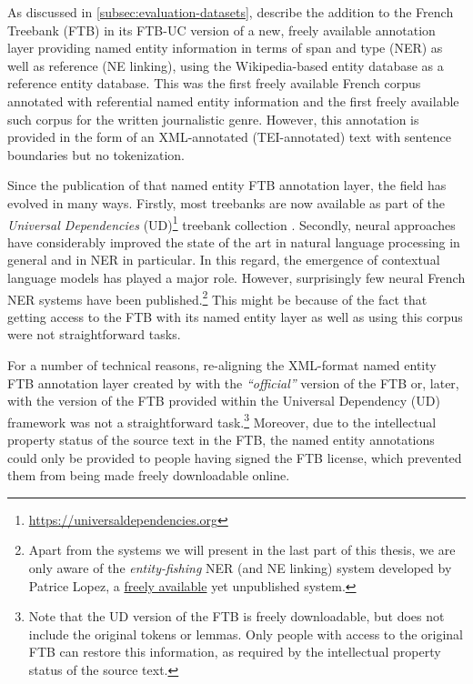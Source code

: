 As discussed in \ref{subsec:evaluation-datasets}, \citet{sagot-etal-2012-annotation} describe the addition to the French Treebank (FTB) \citep{abeille-etal-2003-building} in its FTB-UC version \citep{candito-etal-2010-statistical} of a new, freely available annotation layer providing named entity information in terms of span and type (NER) as well as reference (NE linking), using the Wikipedia-based \aleda entity database \cite{sagot-stern-2012-aleda} as a reference entity database. This was the first freely available French corpus annotated with referential named entity information and the first freely available such corpus for the written journalistic genre. However, this annotation is provided in the form of an XML-annotated (TEI-annotated) text with sentence boundaries but no tokenization.

Since the publication of that named entity FTB annotation layer, the field has evolved in many ways. Firstly, most treebanks are now available as part of the \emph{Universal Dependencies} (UD)\footnote{\url{https://universaldependencies.org}} treebank collection \citep{zeman-etal-2021-universal}. Secondly, neural approaches have considerably improved the state of the art in natural language processing in general and in NER in particular. In this regard, the emergence of contextual language models has played a major role. However, surprisingly few neural French NER systems have been published.\footnote{Apart from the systems we will present in the last part of this thesis, we are only aware of the \emph{entity-fishing} NER (and NE linking) system developed by Patrice Lopez, a \href{https://github.com/kermitt2/entity-fishing}{freely available} yet unpublished system.} This might be because of the fact that getting access to the FTB with its named entity layer as well as using this corpus were not straightforward tasks.

For a number of technical reasons, re-aligning the XML-format named entity FTB annotation layer created by \citet{sagot-etal-2012-annotation} with the \emph{``official''} version of the FTB or, later, with the version of the FTB provided within the Universal Dependency (UD) framework was not a straightforward task.\footnote{Note that the UD version of the FTB is freely downloadable, but does not include the original tokens or lemmas. Only people with access to the original FTB can restore this information, as required by the  intellectual property status of the source text.} Moreover, due to the intellectual property status of the source text in the FTB, the named entity annotations could only be provided to people having signed the FTB license, which prevented them from being made freely downloadable online.

